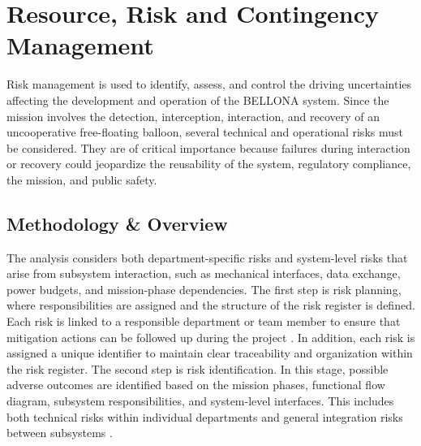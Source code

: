 \vspace{-10pt}
\chapter{Resource, Risk and Contingency Management}


Risk management is used to identify, assess, and control the driving uncertainties affecting the development and operation of the BELLONA system. Since the mission involves the detection, interception, interaction, and recovery of an uncooperative free-floating balloon, several technical and operational risks must be considered. They are of critical importance because failures during interaction or recovery could jeopardize the reusability of the system, regulatory compliance, the mission, and public safety. 
\\
\vspace{-20pt}
\section{Methodology \& Overview} \label{sec:risk-methodology-and-overview}
The analysis considers both department-specific risks and system-level risks that arise from subsystem interaction, such as mechanical interfaces, data exchange, power budgets, and mission-phase dependencies. The first step is risk planning, where responsibilities are assigned and the structure of the risk register is defined. Each risk is linked to a responsible department or team member to ensure that mitigation actions can be followed up during the project \cite{Hamann2006SystemsI}. In addition, each risk is assigned a unique identifier to maintain clear traceability and organization within the risk register. The second step is risk identification. In this stage, possible adverse outcomes are identified based on the mission phases, functional flow diagram, subsystem responsibilities, and system-level interfaces. This includes both technical risks within individual departments and general integration risks between subsystems \cite{Hamann2006SystemsI}.\\

